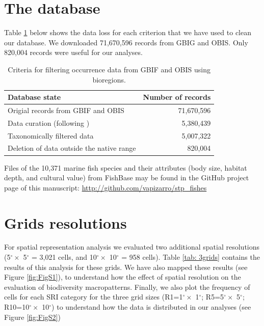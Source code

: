 \documentclass[12pt,authoryear]{elsarticle}
\begin{document}
\clearpage
\appendix

\section{The database}
Table \ref{tab:data cleaning} below shows the data loss for each criterion that we have used to clean our database. We downloaded 71,670,596 records from GBIG and OBIS. Only 820,004 records were useful for our analyses.

\begin{table}[h]
\centering
\begin{tabular}{| l | r |}
  \hline
\textbf{Database state} & \textbf{Number of records}\\ 
  \hline
  Origial records from GBIF and OBIS & 71,670,596 \\ 
  Data curation (following  \cite{zizka2020}) & 5,380,439\\
  Taxonomically filtered data & 5,007,322\\ 
  Deletion of data outside the native range & 820,004\\ 
   \hline
\end{tabular}
\caption{Criteria for filtering occurrence data from GBIF and OBIS using bioregions.}
\label{tab:data cleaning}
\end{table}

Files of the 10,371 marine fish species and their attributes (body size, habitat depth, and cultural value) from FishBase may be found in the GitHub project page of this manuscript: \href{https://github.com/vapizarro/stp_fishes}{http://github.com/vapizarro/stp\_fishes}



\section{Grids resolutions}

For spatial representation analysis we evaluated two additional spatial resolutions (5$^\circ \times$ 5$^\circ$ = 3,021 cells, and 10$^\circ \times$ 10$^\circ$ = 958 cells). Table \ref{tab: 3grids} contains the results of this analysis for these grids. We have also mapped these results (see Figure \ref{fig:FigS1}), to understand how the effect of spatial resolution on the evaluation of biodiversity macropatterns. Finally, we also plot the frequency of cells for each SRI category for the three grid sizes (R1=1$^\circ \times$ 1$^\circ$; R5=5$^\circ \times$ 5$^\circ$; R10=10$^\circ \times$ 10$^\circ$) to understand how the data is distributed in our analyses (see Figure \ref{fig:FigS2})
\end{document}
